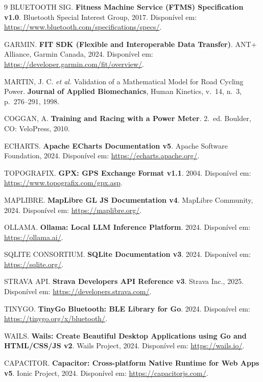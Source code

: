 \documentclass[
    a4paper,
    12pt,
    oneside,
    english,
    brazil,
    chapter=TITLE,
    section=TITLE,
]{abntex2}
\begin{document}
\begin{thebibliography}{9}
    BLUETOOTH SIG.
    \textbf{Fitness Machine Service (FTMS) Specification v1.0}.
    Bluetooth Special Interest Group, 2017.
    Disponível em: \url{https://www.bluetooth.com/specifications/specs/}.

    GARMIN.
    \textbf{FIT SDK (Flexible and Interoperable Data Transfer)}.
    ANT+ Alliance, Garmin Canada, 2024.
    Disponível em: \url{https://developer.garmin.com/fit/overview/}.

    MARTIN, J. C. \textit{et al.}
    Validation of a Mathematical Model for Road Cycling Power.
    \textbf{Journal of Applied Biomechanics}, Human Kinetics, v.~14, n.~3,
    p.~276--291, 1998.

    COGGAN, A.
    \textbf{Training and Racing with a Power Meter}.
    2.~ed. Boulder, CO: VeloPress, 2010.

    ECHARTS.
    \textbf{Apache ECharts Documentation v5}.
    Apache Software Foundation, 2024.
    Disponível em: \url{https://echarts.apache.org/}.

    TOPOGRAFIX.
    \textbf{GPX: GPS Exchange Format v1.1}.
    2004.
    Disponível em: \url{https://www.topografix.com/gpx.asp}.

    MAPLIBRE.
    \textbf{MapLibre GL JS Documentation v4}.
    MapLibre Community, 2024.
    Disponível em: \url{https://maplibre.org/}.

    OLLAMA.
    \textbf{Ollama: Local LLM Inference Platform}.
    2024.
    Disponível em: \url{https://ollama.ai/}.

    SQLITE CONSORTIUM.
    \textbf{SQLite Documentation v3}.
    2024.
    Disponível em: \url{https://sqlite.org/}.

    STRAVA API.
    \textbf{Strava Developers API Reference v3}.
    Strava Inc., 2025.
    Disponível em: \url{https://developers.strava.com/}.

    TINYGO.
    \textbf{TinyGo Bluetooth: BLE Library for Go}.
    2024.
    Disponível em: \url{https://tinygo.org/x/bluetooth/}.

    WAILS.
    \textbf{Wails: Create Beautiful Desktop Applications using Go and HTML/CSS/JS v2}.
    Wails Project, 2024.
    Disponível em: \url{https://wails.io/}.

    CAPACITOR.
    \textbf{Capacitor: Cross-platform Native Runtime for Web Apps v5}.
    Ionic Project, 2024.
    Disponível em: \url{https://capacitorjs.com/}.
\end{thebibliography}
\end{document}
